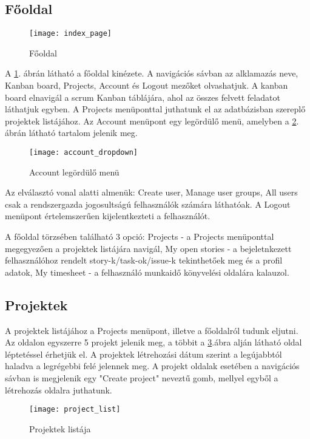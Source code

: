 \subsection{Főoldal}

\begin{figure}[H]
	\centering
	\texttt{[image: index\_page]}
	\caption{Főoldal}
	\label{fig:example-1}
\end{figure}

A \ref{fig:example-1}. ábrán látható a főoldal kinézete. A navigációs sávban az alklamazás neve, Kanban board, Projects, Account és Logout mezőket olvashatjuk. A kanban board elnavigál a scrum Kanban táblájára, ahol az összes felvett feladatot láthatjuk egyben. A Projects menüponttal juthatunk el az adatbázisban szereplő projektek listájához. Az Account menüpont egy legördülő menü, amelyben a \ref{fig:example-2}. ábrán látható tartalom jelenik meg.

\begin{figure}[H]
	\centering
	\texttt{[image: account\_dropdown]}
	\caption{Account legördülő menü}
	\label{fig:example-2}
\end{figure}

Az elválasztó vonal alatti almenük: Create user,  Manage user groups, All users csak a rendszergazda jogosultságú felhasználók számára láthatóak. A Logout menüpont értelemszerűen kijelentkezteti a felhasználót.

A főoldal törzsében található 3 opció: Projects - a Projects menüponttal megegyezően a projektek listájára navigál, My open stories - a bejeletnkezett felhasználóhoz rendelt story-k/task-ok/issue-k tekinthetőek meg és a profil adatok, My timesheet - a felhasználó munkaidő könyvelési oldalára kalauzol.

\subsection{Projektek}
\label{projects}

A projektek listájához a Projects menüpont, illetve a főoldalról tudunk eljutni. Az oldalon egyszerre 5 projekt jelenik meg, a többit a \ref{fig:example-3}.ábra alján látható oldal léptetéssel érhetjük el. A projektek létrehozási dátum szerint a legújabbtól haladva a legrégebbi felé jelennek meg. A projekt oldalak esetében a navigációs sávban is megjelenik egy "Create project" neveztű gomb, mellyel egyből a létrehozás oldalra juthatunk.

\begin{figure}[H]
	\centering
	\texttt{[image: project\_list]}
	\caption{Projektek listája}
	\label{fig:example-3}
\end{figure}

